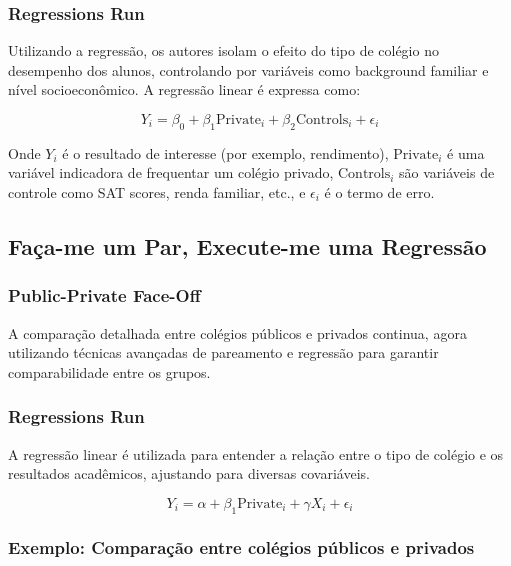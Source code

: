 \documentclass[a4paper,12pt]{article}[abntex2]
\begin{document}
\subsubsection*{Regressions Run}

Utilizando a regressão, os autores isolam o efeito do tipo de colégio no desempenho dos alunos, controlando por variáveis como background familiar e nível socioeconômico. A regressão linear é expressa como:

\begin{equation}
    Y_i = \beta_0 + \beta_1 \text{Private}_i + \beta_2 \text{Controls}_i + \epsilon_i
\end{equation}

Onde \(Y_i\) é o resultado de interesse (por exemplo, rendimento), \(\text{Private}_i\) é uma variável indicadora de frequentar um colégio privado, \(\text{Controls}_i\) são variáveis de controle como SAT scores, renda familiar, etc., e \(\epsilon_i\) é o termo de erro.

\subsection{Faça-me um Par, Execute-me uma Regressão}

\subsubsection*{Public-Private Face-Off}

A comparação detalhada entre colégios públicos e privados continua, agora utilizando técnicas avançadas de pareamento e regressão para garantir comparabilidade entre os grupos.

\subsubsection*{Regressions Run}

A regressão linear é utilizada para entender a relação entre o tipo de colégio e os resultados acadêmicos, ajustando para diversas covariáveis.

\begin{equation}
    Y_i = \alpha + \beta_1 \text{Private}_i + \gamma X_i + \epsilon_i
\end{equation}

\subsubsection*{Exemplo: Comparação entre colégios públicos e privados}
\end{document}
